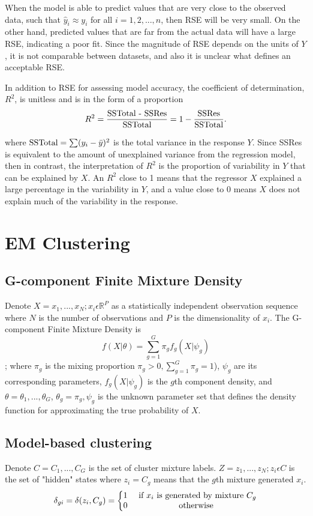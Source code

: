 When the model is able to predict values that are very close to the observed data, such that \(\hat{y}_i \approx y_i\) for all \(i=1,2,...,n\), then RSE will be very small. On the other hand, predicted values that are far from the actual data will have a large RSE, indicating a poor fit. Since the magnitude of RSE depends on the units of \(Y\), it is not comparable between datasets, and also it is unclear what defines an acceptable RSE. 

In addition to RSE for assessing model accuracy, the coefficient of determination, \(R^2\), is unitless and is in the form of a proportion 
\[
    R^2 = \frac{\textup{SSTotal - SSRes}}{\textup{SSTotal}} = 1-\frac{\textup{SSRes}}{\textup{SSTotal}}.
\]

where \(\textup{SSTotal} = \sum (y_i - \bar{y})^2\) is the total variance in the response \(Y\). Since SSRes is equivalent to the amount of unexplained variance from the regression model, then in contrast, the interpretation of \(R^2\) is the proportion of variability in \(Y\) that can be explained by \(X\). An \(R^2\) close to 1 means that the regressor \(X\) explained a large percentage in the variability in \(Y\), and a value close to 0 means \(X\) does not explain much of the variability in the response.

\section{EM Clustering}
\label{sec:modelbased_ch3}

\subsection{G-component Finite Mixture Density}
\label{sec:gcomponentmixturedensity}
Denote \(X={x_1, ..., x_N; x_i \epsilon \mathbb{R}^P}\) as a statistically independent observation sequence where \(N\) is the number of observations and \(P\) is the dimensionality of \(x_i\).
The G-component Finite Mixture Density is \[f(X|\theta) = \sum_{g=1}^{G} \pi_g f_g(X|\psi_g)\];
where \(\pi_g\) is the mixing proportion \(\pi_g > 0, \sum_{g=1}^{G} \pi_g=1\)), \(\psi_g\) are its corresponding parameters, \(f_g(X|\psi_g)\) is the \(g\)th component density, and \(\theta={\theta_1, ..., \theta_G}\), \(\theta_g={\pi_g,\psi_g}\) is the unknown parameter set that defines the density function for approximating the true probability of \(X\).


\subsection{Model-based clustering}
\label{sec:modelbasedclustering}
Denote \(C={C_1, ..., C_G}\) is the set of cluster mixture labels. \(Z={z_1, ..., z_N; z_i \epsilon C}\) is the set of "hidden" states where \(z_i=C_g\) means that the \(g\)th mixture generated \(x_i\). 
\[\delta_{gi}=\delta(z_i,C_g)=\left\{\begin{matrix}
    1 & \textup{ if } x_i \textup{ is generated by mixture } C_g \\ 
    0 & \textup{ otherwise }
    \end{matrix}\right.\]

